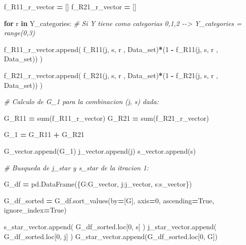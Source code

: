 \documentclass[
  11pt,
  a4paper,
]{article}
\newenvironment{Shaded}{\begin{snugshade}}{\end{snugshade}}
\newcommand{\BuiltInTok}[1]{#1}
\newcommand{\CommentTok}[1]{\textcolor[rgb]{0.56,0.35,0.01}{\textit{#1}}}
\newcommand{\ControlFlowTok}[1]{\textcolor[rgb]{0.13,0.29,0.53}{\textbf{#1}}}
\newcommand{\DecValTok}[1]{\textcolor[rgb]{0.00,0.00,0.81}{#1}}
\newcommand{\KeywordTok}[1]{\textcolor[rgb]{0.13,0.29,0.53}{\textbf{#1}}}
\newcommand{\NormalTok}[1]{#1}
\newcommand{\OperatorTok}[1]{\textcolor[rgb]{0.81,0.36,0.00}{\textbf{#1}}}
\newcommand{\StringTok}[1]{\textcolor[rgb]{0.31,0.60,0.02}{#1}}
\newcommand{\VariableTok}[1]{\textcolor[rgb]{0.00,0.00,0.00}{#1}}
\begin{document}
\begin{Shaded}
\begin{Highlighting}[]
\NormalTok{                f\_R11\_r\_vector }\OperatorTok{=}\NormalTok{ []}
\NormalTok{                f\_R21\_r\_vector }\OperatorTok{=}\NormalTok{ []}

                \ControlFlowTok{for}\NormalTok{ r }\KeywordTok{in}\NormalTok{ Y\_categories:  }\CommentTok{\# Si Y tiene como categorias 0,1,2 {-}{-}\textgreater{} Y\_categories = range(0,3)}

\NormalTok{                    f\_R11\_r\_vector.append( f\_R11(j, s, r , Data\_set)}\OperatorTok{*}\NormalTok{(}\DecValTok{1} \OperatorTok{{-}}\NormalTok{ f\_R11(j, s, r , Data\_set)) )}

\NormalTok{                    f\_R21\_r\_vector.append( f\_R21(j, s, r , Data\_set)}\OperatorTok{*}\NormalTok{(}\DecValTok{1} \OperatorTok{{-}}\NormalTok{ f\_R21(j, s, r , Data\_set)) )}

                                  
            \CommentTok{\# Calculo de G\_1 para la combinacion (j, s) dada:}

\NormalTok{                G\_R11 }\OperatorTok{=}  \BuiltInTok{sum}\NormalTok{(f\_R11\_r\_vector)}
\NormalTok{                G\_R21 }\OperatorTok{=}  \BuiltInTok{sum}\NormalTok{(f\_R21\_r\_vector)}

\NormalTok{                G\_1 }\OperatorTok{=}\NormalTok{  G\_R11 }\OperatorTok{+}\NormalTok{ G\_R21}

\NormalTok{                G\_vector.append(G\_1)}
\NormalTok{                j\_vector.append(j)}
\NormalTok{                s\_vector.append(s)}


        \CommentTok{\# Busqueda de j\_star y s\_star de la itracion 1:}

\NormalTok{        G\_df }\OperatorTok{=}\NormalTok{ pd.DataFrame(\{}\StringTok{\textquotesingle{}G\textquotesingle{}}\NormalTok{:G\_vector, }\StringTok{\textquotesingle{}j\textquotesingle{}}\NormalTok{:j\_vector, }\StringTok{\textquotesingle{}s\textquotesingle{}}\NormalTok{:s\_vector\})}

\NormalTok{        G\_df\_sorted }\OperatorTok{=}\NormalTok{ G\_df.sort\_values(by}\OperatorTok{=}\NormalTok{[}\StringTok{\textquotesingle{}G\textquotesingle{}}\NormalTok{], axis}\OperatorTok{=}\DecValTok{0}\NormalTok{, ascending}\OperatorTok{=}\VariableTok{True}\NormalTok{, ignore\_index}\OperatorTok{=}\VariableTok{True}\NormalTok{)}

\NormalTok{        s\_star\_vector.append( G\_df\_sorted.loc[}\DecValTok{0}\NormalTok{, }\StringTok{\textquotesingle{}s\textquotesingle{}}\NormalTok{] )}
\NormalTok{        j\_star\_vector.append( G\_df\_sorted.loc[}\DecValTok{0}\NormalTok{, }\StringTok{\textquotesingle{}j\textquotesingle{}}\NormalTok{] )}
\NormalTok{        G\_star\_vector.append(G\_df\_sorted.loc[}\DecValTok{0}\NormalTok{, }\StringTok{\textquotesingle{}G\textquotesingle{}}\NormalTok{])}


\end{Highlighting}
\end{Shaded}
\end{document}
